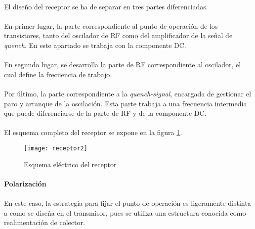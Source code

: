 \paragraph{}
El diseño del receptor se ha de separar en tres partes diferenciadas.
\paragraph{}
En primer lugar, la parte correspondiente al punto de operación de los transistores, tanto del oscilador de RF como del amplificador de la señal de \textit{quench}. En este apartado se trabaja con la componente DC.
\paragraph{}
En segundo lugar, se desarrolla la parte de RF correspondiente al oscilador, el cual define la frecuencia de trabajo. 
\paragraph{}
Por último, la parte correspondiente a la \textit{quench-signal}, encargada de gestionar el paro y arranque de la oscilación. Esta parte trabaja a una frecuencia intermedia que puede diferenciarse de la parte de RF y de la componente DC.

\paragraph{}
El esquema completo del receptor se expone en la figura \ref{fig:rx}.
\begin{figure}[h]
    \centering
    \texttt{[image: receptor2]}
    \caption{Esquema el\'ectrico del receptor}
    \label{fig:rx}
\end{figure}

\paragraph{Polarización} %
\paragraph{}
En este caso, la estrategia para fijar el punto de operación es ligeramente distinta a como se diseña en el transmisor, pues se utiliza una estructura conocida como realimentaci\'on de colector. 
